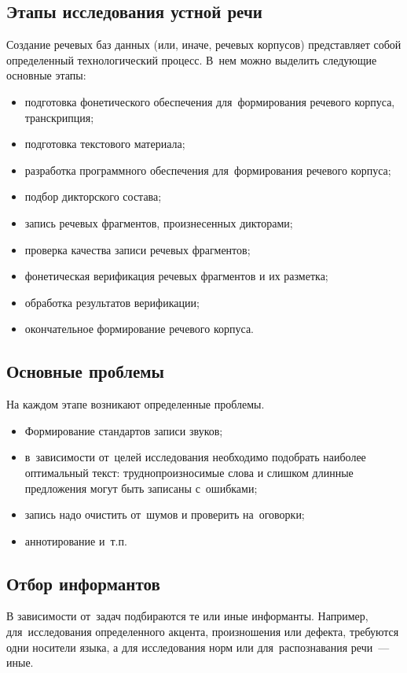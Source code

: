 \documentclass[12pt]{article}
\theoremstyle{definition}
\theoremstyle{remark}
\numberwithin{equation}{section}
\begin{document}
\subsection{Этапы исследования устной речи}
Создание речевых баз данных (или, иначе, речевых корпусов) представляет
собой определенный технологический процесс. В~нем можно выделить следующие
основные этапы:
\begin{itemize}
    \item подготовка фонетического обеспечения для~формирования речевого
    корпуса, транскрипция;
    \item подготовка текстового материала;
    \item разработка программного обеспечения для~формирования речевого
    корпуса;
    \item подбор дикторского состава;
    \item запись речевых фрагментов, произнесенных дикторами;
    \item проверка качества записи речевых фрагментов;
    \item фонетическая верификация речевых фрагментов и их разметка;
    \item обработка результатов верификации;
    \item окончательное формирование речевого корпуса.
\end{itemize}
\subsection{Основные проблемы}
На каждом этапе возникают определенные проблемы.
\begin{itemize}
    \item Формирование стандартов записи звуков;
    \item в~зависимости от~целей исследования необходимо подобрать
    наиболее оптимальный текст: труднопроизносимые слова и слишком длинные
    предложения могут быть записаны с~ошибками;
    \item запись надо очистить от~шумов и проверить на~оговорки;
    \item аннотирование и~т.п.
\end{itemize}

\subsection{Отбор информантов}
В зависимости от~задач подбираются те или иные информанты. Например,
для~исследования определенного акцента, произношения или дефекта,
требуются одни носители языка, а для исследования норм или для~распознавания
речи~--- иные.
\end{document}

